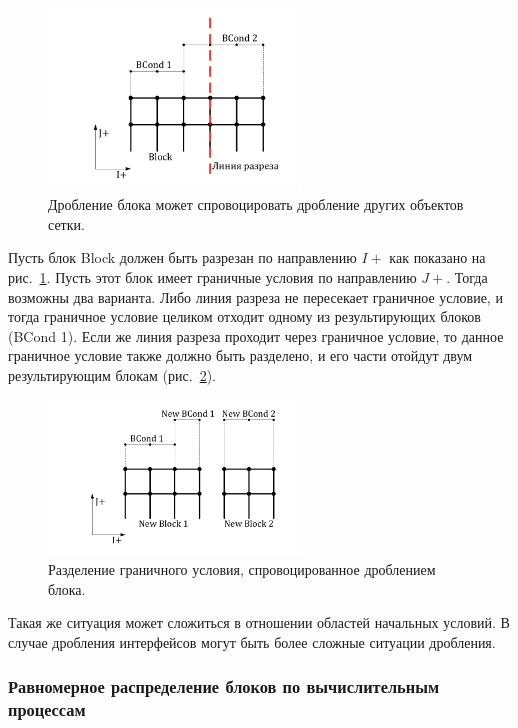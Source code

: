 \begin{figure}[ht]
	\centering
	\includegraphics[width=0.6\textwidth]{./pics/text_2_withcut/cut-bcond.pdf}
	\caption{Дробление блока может спровоцировать дробление других объектов сетки.}
	\label{fig:text_2_withcut_cut_bcond}
\end{figure}

Пусть блок Block должен быть разрезан по направлению $I+$ как показано на рис.~\ref{fig:text_2_withcut_cut_bcond}.
Пусть этот блок имеет граничные условия по направлению $J+$.
Тогда возможны два варианта.
Либо линия разреза не пересекает граничное условие, и тогда граничное условие целиком отходит одному из результирующих блоков (BCond 1).
Если же линия разреза проходит через граничное условие, то данное граничное условие также должно быть разделено, и его части отойдут двум результирующим блокам (рис.~\ref{fig:text_2_withcut_cut_bcond2}).

\begin{figure}[ht]
	\centering
	\includegraphics[width=0.6\textwidth]{./pics/text_2_withcut/cut-bcond2.pdf}
	\caption{Разделение граничного условия, спровоцированное дроблением блока.}
	\label{fig:text_2_withcut_cut_bcond2}
\end{figure}

Такая же ситуация может сложиться в отношении областей начальных условий.
В случае дробления интерфейсов могут быть более сложные ситуации дробления.

\subsubsection{Равномерное распределение блоков по вычислительным процессам}


